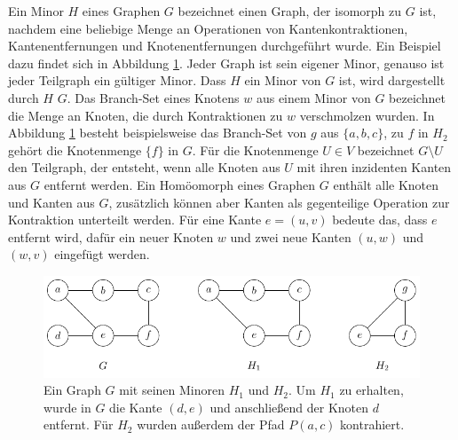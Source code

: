 Ein Minor $H$ eines Graphen $G$ bezeichnet einen Graph, der isomorph zu $G$ ist, nachdem eine beliebige Menge an Operationen von Kantenkontraktionen, Kantenentfernungen und Knotenentfernungen durchgeführt wurde.
Ein Beispiel dazu findet sich in Abbildung \ref{fig:Minor}.
Jeder Graph ist sein eigener Minor, genauso ist jeder Teilgraph ein gültiger Minor.
Dass $H$ ein Minor von $G$ ist, wird dargestellt durch $H$ \minor $G$.
Das Branch-Set eines Knotens $w$ aus einem Minor von $G$ bezeichnet die Menge an Knoten, die durch Kontraktionen zu $w$ verschmolzen wurden.
In Abbildung \ref{fig:Minor} besteht beispielsweise das Branch-Set von $g$ aus $\{a, b, c\}$, zu $f$ in $H_2$ gehört die Knotenmenge $\{f\}$ in $G$.
Für die Knotenmenge $U \in V$ bezeichnet $G \setminus U$ den Teilgraph, der entsteht, wenn alle Knoten aus $U$ mit ihren inzidenten Kanten aus $G$ entfernt werden.
Ein Homöomorph eines Graphen $G$ enthält alle Knoten und Kanten aus $G$, zusätzlich können aber Kanten als gegenteilige Operation zur Kontraktion unterteilt werden.
Für eine Kante $e = (u, v)$ bedeute das, dass $e$ entfernt wird, dafür ein neuer Knoten $w$ und zwei neue Kanten $(u, w)$ und $(w, v)$ eingefügt werden.
\begin{figure}[H]
  \centering
  \includegraphics[keepaspectratio]{bilder/Minor.pdf}
  \caption{Ein Graph $G$ mit seinen Minoren $H_1$ und $H_2$.
           Um $H_1$ zu erhalten, wurde in $G$ die Kante $(d, e)$ und anschließend der Knoten $d$ entfernt.
           Für $H_2$ wurden außerdem der Pfad $P(a, c)$ kontrahiert.}
  \label{fig:Minor}
\end{figure}

